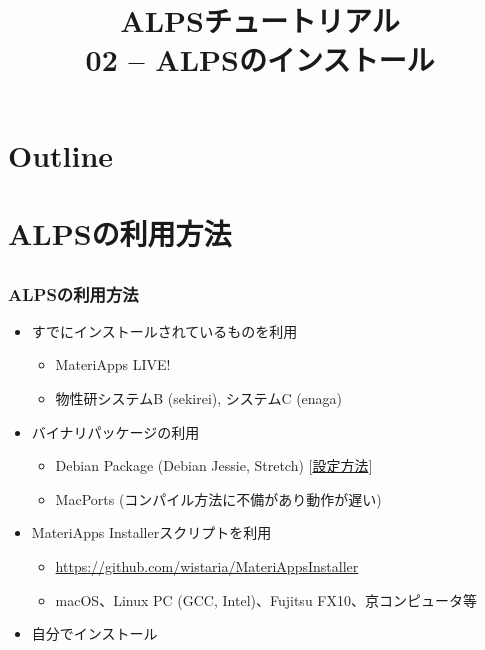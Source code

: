 
\title{ALPSチュートリアル \\ 02 -- ALPSのインストール}



\begin{frame}
  \titlepage
\end{frame}

\section*{Outline}
\begin{frame}
  \tableofcontents
\end{frame}

\section{ALPSの利用方法}

\subsection*{\redb\whiteb\greenb}
\begin{frame}[fragile]
  \frametitle{ALPSの利用方法}
  \begin{itemize}
    \setlength{\itemsep}{1em}
  \item すでにインストールされているものを利用
    \begin{itemize}
    \item MateriApps LIVE!
    \item 物性研システムB (sekirei), システムC (enaga)
    \end{itemize}
  \item バイナリパッケージの利用
    \begin{itemize}
    \item Debian Package (Debian Jessie, Stretch) [\href{https://github.com/cmsi/MateriAppsLive/wiki/UsingMateriAppsInDebian}{設定方法}]
    \item MacPorts (コンパイル方法に不備があり動作が遅い)
    \end{itemize}
  \item MateriApps Installerスクリプトを利用
    \begin{itemize}
    \item \url{https://github.com/wistaria/MateriAppsInstaller}
    \item macOS、Linux PC (GCC, Intel)、Fujitsu FX10、京コンピュータ等
    \end{itemize}
  \item 自分でインストール
  \end{itemize}
\end{frame}


